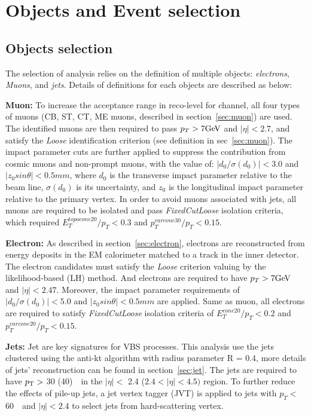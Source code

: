 \section{Objects and Event selection}
\label{sec:vbszz_selection}

\subsection{Objects selection}

The selection of analysis relies on the definition of multiple objects: \textit{electrons}, \textit{Muons}, and \textit{jets}.
Details of definitions for each objects are described as below:

\textbf{Muon:} 
To increase the acceptance range in reco-level for \lllljj channel, all four types of muons 
(CB, ST, CT, ME muons, described in section~\ref{sec:muon}) are used.
The identified muons are then required to pass $p_{T} > 7 \text{Ge\kern -0.1em V}$ and $|\eta| < 2.7$,
and satisfy the \textit{Loose} identification criterion (see definition in sec~\ref{sec:muon}).
The impact parameter cuts are further applied to suppress the contribution from cosmic muons and non-prompt muons,
with the value of: $|d_{0}/\sigma(d_{0})| < 3.0$ and $|z_{0} sin\theta| < 0.5 mm$,
where $d_{0}$ is the transverse impact parameter relative to the beam line, $\sigma(d_{0})$ is its uncertainty, 
and $z_{0}$ is the longitudinal impact parameter relative to the primary vertex.
In order to avoid muons associated with jets, all muons are required to be isolated and pass \textit{FixedCutLoose} isolation criteria,
which required $E_{T}^{topocone20} / p_{T} < 0.3$ and $p_{T}^{varcone30} / p_{T} < 0.15$.

\textbf{Electron:} 
As described in section~\ref{sec:electron}, electrons are reconstructed from energy deposits in the EM calorimeter matched to a track in the inner detector.
The electron candidates must satisfy the \textit{Loose} criterion valuing by the likelihood-based (LH) method.
And electrons are required to have $p_{T} > 7 \text{Ge\kern -0.1em V}$ and $|\eta| < 2.47$.
Moreover, the impact parameter requirements of $|d_{0}/\sigma(d_{0})| < 5.0$ and $|z_{0} sin\theta| < 0.5 mm$ are applied.
Same as muon, all electrons are required to satisfy \textit{FixedCutLoose} isolation criteria
of $E_{T}^{cone20} / p_{T} < 0.2$ and $p_{T}^{varcone20} / p_{T} < 0.15$.

\textbf{Jets:} 
Jet are key signatures for VBS processes. 
This analysis use the jets clustered using the anti-kt algorithm with radius parameter R = 0.4, more details of jets' reconstruction can be found in section~\ref{sec:jet}.
The jets are required to have $p_{\text{T}} >$ 30 (40)~\gev~in the $|\eta| <$ 2.4 ($2.4 < |\eta| < 4.5)$ region.
To further reduce the effects of pile-up jets, a jet vertex tagger (JVT) is applied to jets with $p_{T} <$ 60~\gev~and $|\eta| < 2.4$ to select jets from hard-scattering vertex.


